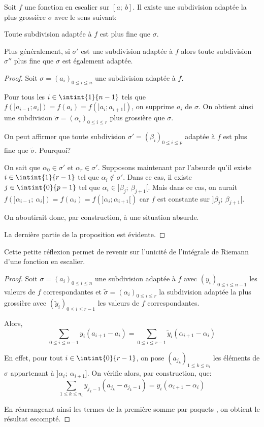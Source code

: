 \begin{prop}
Soit $f$ une fonction en escalier sur $[a;~b]$. Il existe une subdivision adaptée la plus grossière $\sigma$ avec le sens suivant:

Toute subdivision adaptée à $f$ est plus fine que $\sigma$.

Plus généralement, si $\sigma'$ est une subdivision adaptée à $f$ alors toute subdivision $\sigma''$ plus fine que $\sigma$ est également adaptée.
\end{prop}

\begin{proof}
Soit $\sigma = (a_i)_{0 \leq i \leq n}$ une subdivision adaptée à $f$.

Pour tous les $i \in \intint{1}{n-1}$ tels que $f\left(]a_{i-1};a_i[\right)=f(a_i)=f\left(]a_i;a_{i+1}[\right)$, on supprime $a_i$ de $\sigma$. On obtient ainsi une subdivision $\tilde{\sigma} = (\alpha_i)_{0 \leq i \leq r}$ plus grossière que $\sigma$.

On peut affirmer que toute subdivision $\sigma' = (\beta_i)_{0 \leq i \leq p}$ adaptée à $f$ est plus fine que $\tilde{\sigma}$. Pourquoi? 

On sait que $\alpha_0 \in \sigma'$ et $\alpha_r \in \sigma'$. Supposons maintenant par l'absurde qu'il existe $i \in \intint{1}{r-1}$ tel que $\alpha_i \notin \sigma'$. Dans ce cas, il existe $j \in \intint{0}{p-1}$ tel que $\alpha_i \in ]\beta_j;~\beta_{j+1}[$. Mais dans ce cas, on aurait $f\left(]\alpha_{i-1};~\alpha_i[\right)=f(\alpha_i)=f\left(]\alpha_i;\alpha_{i+1}[\right)$ car $f$ est constante sur $]\beta_j;~\beta_{j+1}[$.

On aboutirait donc, par construction, à une situation absurde.

La dernière partie de la proposition est évidente.
\end{proof}

Cette petite réflexion permet de revenir sur l'unicité de l'intégrale de Riemann d'une fonction en escalier.

\begin{proof}
Soit $\sigma =(a_i)_{0 \leq i \leq n}$ une subdivision adaptée à $f$ avec $(y_i)_{0 \leq i \leq n-1}$ les valeurs de $f$ correspondantes et $\tilde{\sigma} = (\alpha_i)_{0 \leq i \leq r}$ la subdivision adaptée la plus grossière avec $(\widetilde{y}_i)_{0 \leq i \leq r-1}$ les valeurs de $f$ correspondantes.

Alors, 
\[
\displaystyle{\sum \limits_{0 \leq i \leq n-1}} y_i(a_{i+1}-a_i) = \displaystyle{\sum \limits_{0 \leq i \leq r-1}} \widetilde{y}_i(\alpha_{i+1}-\alpha_i)
\]

En effet, pour tout $i \in \intint{0}{r-1}$, on pose $(a_{j_k})_{1 \leq k \leq n_i}$ les éléments de $\sigma$ appartenant à $]\alpha_i;~\alpha_{i+1}]$. On vérifie alors, par construction, que:
\[\displaystyle{\sum \limits_{1 \leq k \leq n_i}} y_{j_k-1}(a_{j_k}-a_{j_{k}-1}) = y_i(\alpha_{i+1}-\alpha_i)\]

En réarrangeant ainsi les termes de la première somme \og par paquets \fg{}, on obtient le résultat escompté.
\end{proof}


